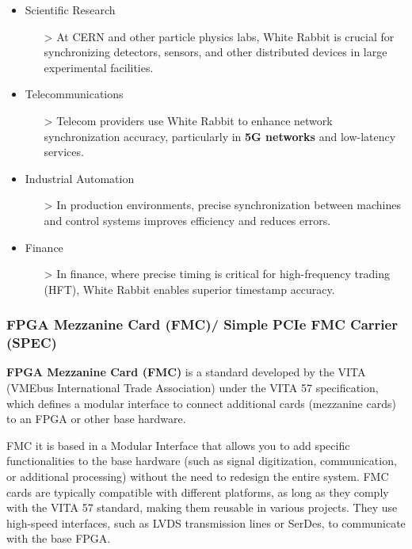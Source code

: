 \begin{itemize}
\item Scientific Research
    \begin{itemize}
    \item[>] At CERN and other particle physics labs, White Rabbit is crucial for synchronizing detectors, sensors, and other distributed devices in large experimental facilities.
    \end{itemize}
\item Telecommunications
    \begin{itemize}
    \item[>] Telecom providers use White Rabbit to enhance network synchronization accuracy, particularly in \textbf{5G networks} and low-latency services.
    \end{itemize}
\item Industrial Automation
    \begin{itemize}
    \item[>] In production environments, precise synchronization between machines and control systems improves efficiency and reduces errors.
    \end{itemize}
\item Finance
    \begin{itemize}
    \item[>] In finance, where precise timing is critical for high-frequency trading (HFT), White Rabbit enables superior timestamp accuracy.
    \end{itemize}
\end{itemize}

\subsubsection{FPGA Mezzanine Card (FMC)/ Simple PCIe FMC Carrier (SPEC)}
\label{FMC-SPEC}

\textbf{FPGA Mezzanine Card (FMC)} is a standard developed by the VITA (VMEbus International Trade Association) under the VITA 57 specification, which defines a modular interface to connect additional cards (mezzanine cards) to an FPGA or other base hardware.

\vspace{5 mm}

\noindent FMC it is based in a Modular Interface that allows you to add specific functionalities to the base hardware (such as signal digitization, communication, or additional processing) without the need to redesign the entire system.
FMC cards are typically compatible with different platforms, as long as they comply with the VITA 57 standard, making them reusable in various projects.
They use high-speed interfaces, such as LVDS transmission lines or SerDes, to communicate with the base FPGA.

